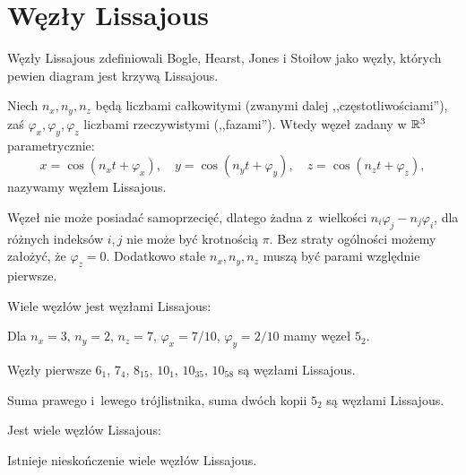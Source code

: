 
\section{Węzły Lissajous}
%
Węzły Lissajous zdefiniowali Bogle, Hearst, Jones i Stoiłow \cite{bogle1994} jako węzły, których pewien diagram jest krzywą Lissajous.
%
%
%
%

\begin{definition}
    Niech $n_x, n_y, n_z$ będą liczbami całkowitymi (zwanymi dalej ,,częstotliwościami''), zaś  $\varphi_x, \varphi_y, \varphi_z$ liczbami rzeczywistymi (,,fazami'').
    Wtedy węzeł zadany w $\mathbb R^3$ parametrycznie:
    \begin{equation}
        x = \cos(n_xt + \varphi_x), \quad
        y = \cos(n_yt + \varphi_y), \quad
        z = \cos(n_zt + \varphi_z),
    \end{equation}
    nazywamy węzłem Lissajous.
\end{definition}

Węzeł nie może posiadać samoprzecięć, dlatego żadna z~wielkości $n_i\varphi_j-n_j\varphi_i$, dla różnych indeksów $i, j$ nie może być krotnością $\pi$.
Bez straty ogólności możemy założyć, że $\varphi_z = 0$.
Dodatkowo stałe $n_x, n_y, n_z$ muszą być parami względnie pierwsze.

Wiele węzłów jest węzłami Lissajous:


\begin{example}
    Dla $n_x = 3$, $n_y = 2$, $n_z = 7$, $\varphi_x = 7/10$, $\varphi_y = 2/10$ mamy węzeł $5_2$.
\end{example}

\begin{example}
    Węzły pierwsze $6_1$, $7_4$, $8_{15}$, $10_1$, $10_{35}$, $10_{58}$ są węzłami Lissajous.
\end{example}


\begin{example}
    Suma prawego i~lewego trójlistnika, suma dwóch kopii $5_2$ są węzłami Lissajous.
\end{example}

Jest wiele węzłów Lissajous:

\begin{proposition}
    Istnieje nieskończenie wiele węzłów Lissajous.
\end{proposition}

